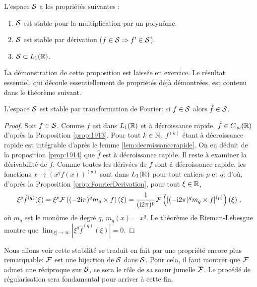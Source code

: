 \begin{proposition}
L'espace $\mathcal{S}$ a les propri{\'e}t{\'e}s suivantes :
\begin{enumerate}
\item $\mathcal{S}$ est stable pour la multiplication par un polyn{\^o}me.
\item $\mathcal{S}$ est stable par d{\'e}rivation ($f \in \mathcal{S} \Rightarrow f' \in  \mathcal{S}$).
\item $\mathcal{S} \subset  L_1(\mathbb{R})$.
\end{enumerate}
\end{proposition}
La d{\'e}monstration de cette proposition est laiss{\'e}e en exercice.  Le r{\'e}sultat
essentiel, qui d{\'e}coule essentiellement de propri{\'e}t{\'e}s d{\'e}j{\`a} d{\'e}montr{\'e}es, est
contenu dans le th{\'e}or{\`e}me suivant.
\begin{theorem}
\label{theo:stabiliteS}
L'espace $\mathcal{S}$ est stable par transformation de Fourier: si $f \in \mathcal{S}$ alors $\hat{f} \in \mathcal{S}$.
\end{theorem}
\begin{proof}
Soit $f \in \mathcal{S}$. Comme
$f$ est dans $L_1(\mathbb{R})$ et {\`a} d{\'e}croissance rapide, $\hat{f} \in C_\infty (\mathbb{R})$ d'apr{\`e}s la Proposition \ref{prop:1913}.
Pour tout $k \in \mathbb{N}$, $f^{(k)}$ {\'e}tant {\`a} d{\'e}croissance rapide est int{\'e}grable d'apr{\`e}s le lemme \ref{lem:decroissancerapide}.
On en d{\'e}duit de la proposition \ref{prop:1914} que $\hat{f}$ est {\`a} d{\'e}croissance rapide.
Il reste {\`a} examiner la d{\'e}rivabilit{\'e} de $f$.
Comme toutes les d{\'e}riv{\'e}es de $f$ sont {\`a} d{\'e}croissance rapide, les fonctions $x\mapsto(x^q f (x))^{(p)}$ sont dans
$L_1(\mathbb{R})$ pour tout entiers $p$ et $q$; d'o{\`u}, d'apr{\`e}s la Proposition \ref{prop:FourierDerivation}, pour tout
$\xi\in\mathbb{R}$,
\begin{equation}
  \label{eq:stabilite-S-en-action}
\xi^p \hat{f}^{(q)}(\xi) = \xi^p  \mathcal{F}\left( (-2 \mathrm{i} \pi)^q m_q\times f \right)(\xi) =
\frac{1}{(\mathrm{i} 2 \pi)^p} \mathcal{F}\left( [(- \mathrm{i} 2 \pi)^q m_q \times f]^{(p)} \right)(\xi) \;,
\end{equation}
o{\`u} $m_q$ est le mon{\^o}me de degr{\'e} $q$, $m_q(x)=x^q$.  Le th{\'e}or{\`e}me
de Rieman-Lebesgue montre que $\lim_{|\xi| \to \infty} |\xi^q
\hat{f}^{(q)}(\xi)|= 0$.
\end{proof}

Nous allons voir cette stabilit{\'e} se traduit en fait par une propri{\'e}t{\'e} encore
plus remarquable: $\mathcal{F}$ est une bijection de $\mathcal{S}$ dans $\mathcal{S}$. Pour cela, il
faut montrer que $\mathcal{F}$ admet une r{\'e}ciproque sur $\mathcal{S}$, ce sera le r{\^o}le de sa
soeur jumelle $\overline{\mathcal{F}}$. Le proc{\'e}d{\'e} de r{\'e}gularisation sera fondamental pour
arriver {\`a} cette fin.




